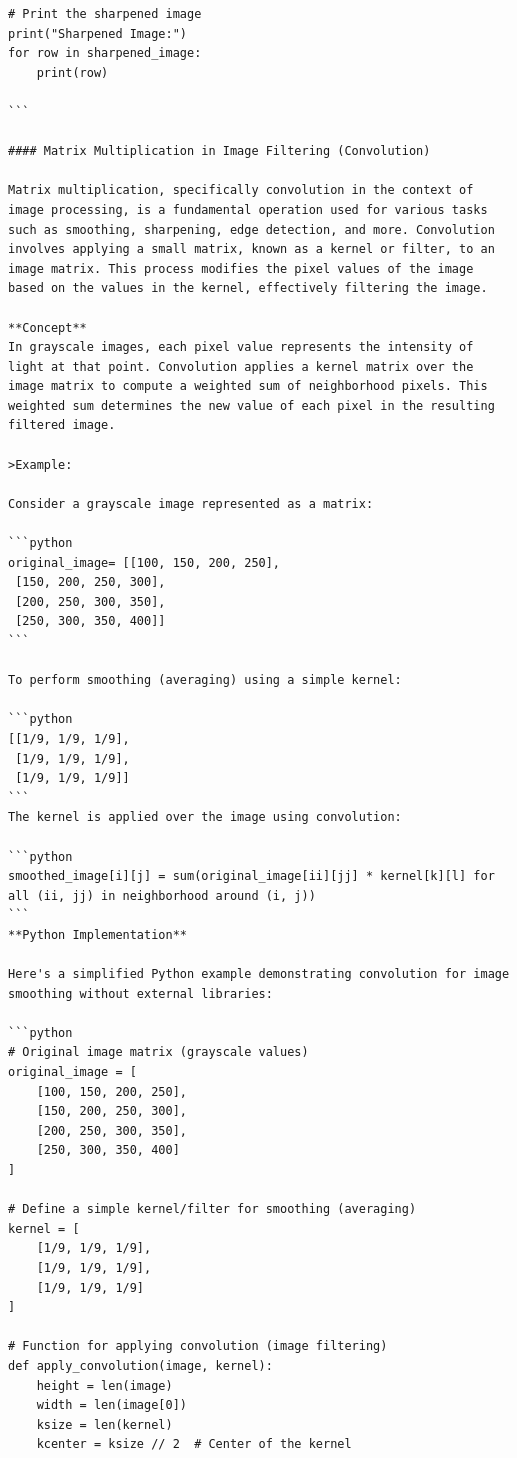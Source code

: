\documentclass[
  letterpaper,
  DIV=11,
  numbers=noendperiod]{scrreprt}
\theoremstyle{plain}
\theoremstyle{definition}
\theoremstyle{remark}
\begin{document}
\begin{verbatim}
# Print the sharpened image
print("Sharpened Image:")
for row in sharpened_image:
    print(row)

```

#### Matrix Multiplication in Image Filtering (Convolution)

Matrix multiplication, specifically convolution in the context of image processing, is a fundamental operation used for various tasks such as smoothing, sharpening, edge detection, and more. Convolution involves applying a small matrix, known as a kernel or filter, to an image matrix. This process modifies the pixel values of the image based on the values in the kernel, effectively filtering the image.

**Concept**
In grayscale images, each pixel value represents the intensity of light at that point. Convolution applies a kernel matrix over the image matrix to compute a weighted sum of neighborhood pixels. This weighted sum determines the new value of each pixel in the resulting filtered image.

>Example:

Consider a grayscale image represented as a matrix:

```python
original_image= [[100, 150, 200, 250],
 [150, 200, 250, 300],
 [200, 250, 300, 350],
 [250, 300, 350, 400]]
```

To perform smoothing (averaging) using a simple kernel:

```python
[[1/9, 1/9, 1/9],
 [1/9, 1/9, 1/9],
 [1/9, 1/9, 1/9]]
```
The kernel is applied over the image using convolution:

```python
smoothed_image[i][j] = sum(original_image[ii][jj] * kernel[k][l] for all (ii, jj) in neighborhood around (i, j))
```
**Python Implementation**

Here's a simplified Python example demonstrating convolution for image smoothing without external libraries:

```python
# Original image matrix (grayscale values)
original_image = [
    [100, 150, 200, 250],
    [150, 200, 250, 300],
    [200, 250, 300, 350],
    [250, 300, 350, 400]
]

# Define a simple kernel/filter for smoothing (averaging)
kernel = [
    [1/9, 1/9, 1/9],
    [1/9, 1/9, 1/9],
    [1/9, 1/9, 1/9]
]

# Function for applying convolution (image filtering)
def apply_convolution(image, kernel):
    height = len(image)
    width = len(image[0])
    ksize = len(kernel)
    kcenter = ksize // 2  # Center of the kernel


\end{verbatim}
\end{document}
